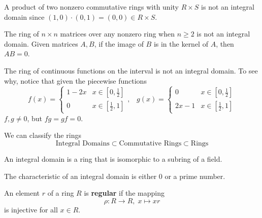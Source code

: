     \begin{example}
      A product of two nonzero commutative rings with unity $R \times S$ is not an integral domain since $(1,0) \cdot (0, 1) = (0, 0) \in R \times S$. 
    \end{example}

    \begin{example}
      The ring of $n \times n$ matrices over any nonzero ring when $ n \geq 2$ is not an integral domain. Given matrices $A, B$, if the image of $B$ is in the kernel of $A$, then $A B = 0$.
    \end{example}

    \begin{example}
      The ring of continuous functions on the interval is not an integral domain. To see why, notice that given the piecewise functions 
      \begin{equation}
        f (x) = \begin{cases}
        1 - 2x & x \in [0, \frac{1}{2}] \\
        0 & x \in [\frac{1}{2}, 1] 
        \end{cases}, \; \;\;g (x) = \begin{cases}
        0 & x \in [0, \frac{1}{2}] \\
        2x - 1 & x \in [\frac{1}{2}, 1] 
        \end{cases}
      \end{equation}
      $f, g \neq 0$, but $f g = g f = 0$. 
    \end{example}

    We can classify the rings
    \begin{equation}
      \text{Integral Domains} \subset \text{Commutative Rings} \subset \text{Rings}
    \end{equation}

    \begin{proposition}
      An integral domain is a ring that is isomorphic to a subring of a field. 
    \end{proposition}

    \begin{proposition}
      The characteristic of an integral domain is either $0$ or a prime number. 
    \end{proposition}

    \begin{definition}
       An element $r$ of a ring $R$ is \textbf{regular} if the mapping 
       \begin{equation}
         \rho: R \longrightarrow R, \; x \mapsto x r
       \end{equation}
      is injective for all $x \in R$. 
    \end{definition}

